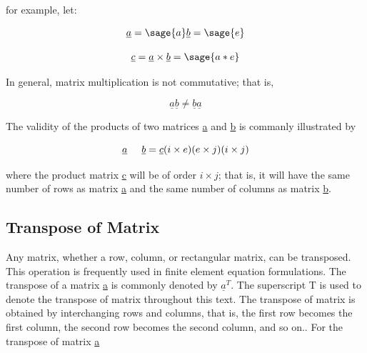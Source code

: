 \documentclass[12pt]{report}
\begin{document}
for example, let:

$$
\underline{a} = \sage{a}\nonumber 
\underline{b} = \sage{e}\nonumber
$$

\begin{eqnarray}
	\underline{c} =\underline{a} \times \underline{b} = \sage{a*e}
\end{eqnarray}

In general, matrix multiplication is not commutative; 
that is,

\begin{equation}
	\underline{a}\underline{b} \neq \underline{b}\underline{a}
\end{equation}

The validity of the products of two matrices \underline{a} and
\underline{b} is commanly illustrated by

\begin{equation} 
\underline{a} \hspace{0.5cm} \underline{b} = \underline{c} \nonumber \\
(i \times e)(e \times j) (i \times j) \label{eq:genmulti}
\end{equation}

where the product matrix \underline{c} will be of order $i \times j$;
that is, it will have the same number of rows as matrix \underline{a}
and the same number of columns as matrix \underline{b}.


\subsection{Transpose of Matrix}

Any matrix, whether a row, column, or rectangular matrix, can be
transposed. This operation is frequently used in finite element
equation formulations. The transpose of a matrix \underline{a} is
commonly denoted by $\underline{a}^T$. The superscript T is used to
denote the transpose of matrix throughout this text. The transpose of
matrix is obtained by interchanging rows and columns, that is, the
first row becomes the first column, the second row becomes the second
column, and so on.. For the transpose of matrix \underline{a}
\end{document}
